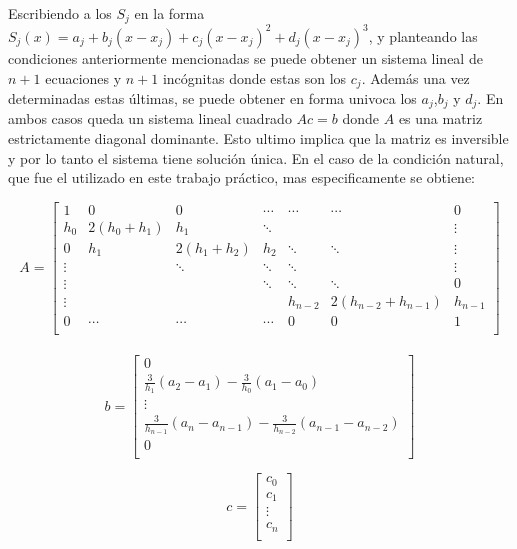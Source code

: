\documentclass[a4paper]{article}
\begin{document}
Escribiendo a los $ S_j $ en la forma $S_j(x) = a_j + b_j(x-x_j)+c_j(x-x_j)^2+d_j(x-x_j)^3$, y planteando las condiciones anteriormente mencionadas se puede obtener un sistema lineal de $ n+1 $ ecuaciones y $ n+1 $ incógnitas donde estas son los $ c_{j} $. Además una vez determinadas estas últimas, se puede obtener en forma univoca los $ a_{j}$,$ b_{j} $ y $d_{j}$. En ambos casos queda un sistema lineal cuadrado $ Ac=b $ donde $ A $ es una matriz estrictamente diagonal dominante. Esto ultimo implica que la matriz es inversible y por lo tanto el sistema tiene solución única. En el caso de la condición natural, que fue el utilizado en este trabajo práctico, mas especificamente se obtiene:

$$
A =
\begin{bmatrix}
    1      & 0                  & 0      & \cdots & \cdots  & \cdots             & 0      \\
    h_0    & 2(h_0+h_1)         & h_1    & \ddots &         &                    & \vdots \\
    0      & h_1 & 2(h_1 + h_2) & h_2    & \ddots & \ddots        &                     \vdots \\
    \vdots &                    & \ddots & \ddots & \ddots  &                    & \vdots \\
    \vdots &                    &        & \ddots & \ddots  & \ddots             & 0      \\
    \vdots &                    &        &        & h_{n-2} & 2(h_{n-2}+h_{n-1}) & h_{n-1} \\
    0      & \cdots             & \cdots & \cdots & 0       & 0                  & 1 \\
\end{bmatrix}
$$ \\


$$
b=
\begin{bmatrix}
0 \\
\frac{3}{h_1}(a_2-a_1)-\frac{3}{h_0}(a_1-a_0) \\
\vdots \\
\frac{3}{h_{n-1}}(a_n-a_{n-1})-\frac{3}{h_{n-2}}(a_{n-1}-a_{n-2}) \\
0 \\
\end{bmatrix}
$$

$$
c=
\begin{bmatrix}
c_0\\
c_1\\
\vdots \\
c_n\\
\end{bmatrix}
$$
\end{document}

